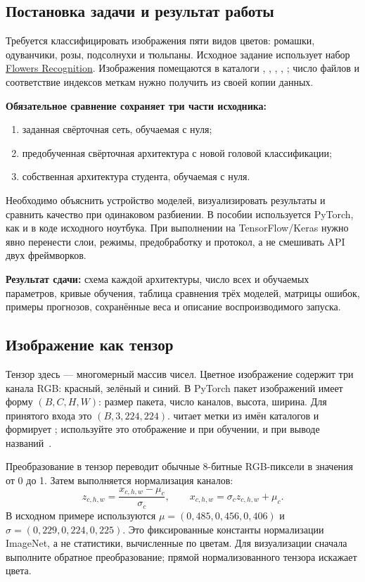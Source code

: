 \subsection{Постановка задачи и результат работы}
Требуется классифицировать изображения пяти видов цветов: ромашки, одуванчики, розы, подсолнухи и тюльпаны. Исходное задание использует набор \href{https://www.kaggle.com/datasets/alxmamaev/flowers-recognition}{Flowers Recognition}. Изображения помещаются в каталоги , , , , ; число файлов и соответствие индексов меткам нужно получить из своей копии данных.

\textbf{Обязательное сравнение сохраняет три части исходника:}
\begin{enumerate}
\item заданная свёрточная сеть, обучаемая с нуля;
\item предобученная свёрточная архитектура с новой головой классификации;
\item собственная архитектура студента, обучаемая с нуля.
\end{enumerate}
Необходимо объяснить устройство моделей, визуализировать результаты и сравнить качество при одинаковом разбиении. В пособии используется PyTorch, как и в коде исходного ноутбука. При выполнении на TensorFlow/Keras нужно явно перенести слои, режимы, предобработку и протокол, а не смешивать API двух фреймворков.

\textbf{Результат сдачи:} схема каждой архитектуры, число всех и обучаемых параметров, кривые обучения, таблица сравнения трёх моделей, матрицы ошибок, примеры прогнозов, сохранённые веса и описание воспроизводимого запуска.

\subsection{Изображение как тензор}
Тензор здесь --- многомерный массив чисел. Цветное изображение содержит три канала RGB: красный, зелёный и синий. В PyTorch пакет изображений имеет форму \((B,C,H,W)\): размер пакета, число каналов, высота, ширина. Для принятого входа это \((B,3,224,224)\).  читает метки из имён каталогов и формирует ; используйте это отображение и при обучении, и при выводе названий~\cite{imagefolder}.

Преобразование в тензор переводит обычные 8-битные RGB-пиксели в значения от 0 до 1. Затем выполняется нормализация каналов:
\begin{equation}
z_{c,h,w}=\frac{x_{c,h,w}-\mu_c}{\sigma_c},\qquad
x_{c,h,w}=\sigma_c z_{c,h,w}+\mu_c.
\end{equation}
В исходном примере используются \(\mu=(0{,}485,0{,}456,0{,}406)\) и \(\sigma=(0{,}229,0{,}224,0{,}225)\). Это фиксированные константы нормализации ImageNet, а не статистики, вычисленные по цветам. Для визуализации сначала выполните обратное преобразование; прямой  нормализованного тензора искажает цвета.

